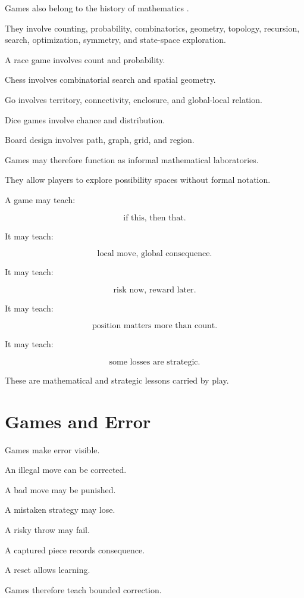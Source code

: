 \documentclass[11pt]{book}
\begin{document}
Games also belong to the history of mathematics \cite{Murray1952BoardGames,Bell1969BoardTableGames,Finkel2007AncientBoardGames}.

They involve counting, probability, combinatorics, geometry, topology, recursion, search, optimization, symmetry, and state-space exploration.

A race game involves count and probability.

Chess involves combinatorial search and spatial geometry.

Go involves territory, connectivity, enclosure, and global-local relation.

Dice games involve chance and distribution.

Board design involves path, graph, grid, and region.

Games may therefore function as informal mathematical laboratories.

They allow players to explore possibility spaces without formal notation.

A game may teach:

\[
\text{if this, then that}.
\]

It may teach:

\[
\text{local move, global consequence}.
\]

It may teach:

\[
\text{risk now, reward later}.
\]

It may teach:

\[
\text{position matters more than count}.
\]

It may teach:

\[
\text{some losses are strategic}.
\]

These are mathematical and strategic lessons carried by play.

\section{Games and Error}

Games make error visible.

An illegal move can be corrected.

A bad move may be punished.

A mistaken strategy may lose.

A risky throw may fail.

A captured piece records consequence.

A reset allows learning.

Games therefore teach bounded correction.
\end{document}
